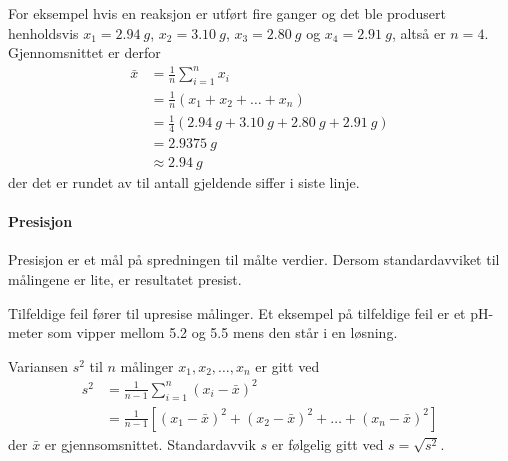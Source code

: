 \documentclass[hidelinks,12pt,norsk,a4paper,fleqn]{scrartcl}
\begin{document}
	For eksempel hvis en reaksjon er utført fire ganger og det ble produsert henholdsvis $x_1=\SI{2.94}{g}$, $x_2=\SI{3.10}{g}$, $x_3=\SI{2.80}{g}$ og $x_4=\SI{2.91}{g}$, altså er $n=4$. Gjennomsnittet er derfor
	\begin{align*}
		\bar{x} &= \frac{1}{n}\sum_{i=1}^{n}x_i\\
		&=\frac{1}{n}\left(x_1 + x_2 + \dots + x_n\right)\\
		&=\frac{1}{4}\left(\SI{2.94}{g} + \SI{3.10}{g} + \SI{2.80}{g} + \SI{2.91}{g}\right)\\
		&=\SI{2.9375}{g}\\
		&\approx\SI{2.94}{g}
	\end{align*}
	der det er rundet av til antall gjeldende siffer i siste linje.
	
	\begin{comment}
		\tikzstyle{every picture}+=[remember picture]
		\everymath{\displaystyle}
		\begin{equation*}
		\bar{x}=\frac{1}{n}\sum_{
		\tikz[baseline]{
		\node[anchor=base, inner sep=0] (idx)
		{$\scriptstyle i$};
		}=
		\tikz[baseline]{
		\node[anchor=base, inner sep=0] (idxs)
		{$\scriptstyle 1$};
		}
		}^{
		\tikz[baseline]{
		\node[anchor=base, inner sep=0] (idxe)
		{$\scriptstyle n$};
		}
		}
		\tikz[baseline]{
		\node[anchor=base, inner sep=0] (ele)
		{$x_i$};
		}
		\tikz[overlay]{
		\draw [->] (idx.south) to +(0,-.5) to +(-.5,-.5) node[left] {indeksvariabel};
		\draw [->] (idxs.south) to +(0,-.5) to +(.5,-.5) node[right]{startindeks};
		\draw [->] (idxe.north) to +(0,.5) to +(.5,.5) node[right]{sluttindeks};
		\draw [->] (ele.east) to +(.5,0) node[right]{uttrykk som summeres};
		\useasboundingbox (-5,2) rectangle (6,-2);
		}
		\end{equation*}
	\end{comment}
	
	\paragraph{Presisjon}
	Presisjon er et mål på spredningen til målte verdier. Dersom standardavviket til målingene er lite, er resultatet presist.
	
	Tilfeldige feil fører til upresise målinger. Et eksempel på tilfeldige feil er et pH-meter som vipper mellom \num{5.2} og \num{5.5} mens den står i en løsning.
	
	Variansen $s^2$ til $n$ målinger $x_1, x_2, \ldots, x_n$ er gitt ved
	\begin{align*}
		s^2 &= \frac{1}{n-1}\sum_{i=1}^{n}(x_i - \bar{x})^2 \\
		&=\frac{1}{n-1}\left[(x_1-\bar{x})^2 + (x_2-\bar{x})^2 + \dots + (x_n-\bar{x})^2\right]
	\end{align*}
	der $\bar{x}$ er gjennsomsnittet. Standardavvik $s$ er følgelig gitt ved	$s=\sqrt{s^2}$.
\end{document}
